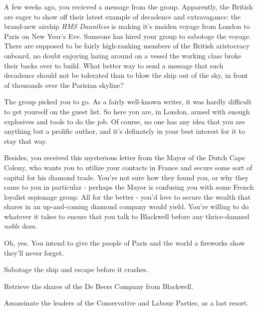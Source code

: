 \documentclass[char]{airship}
\begin{document}
A few weeks ago, you recieved a message from the group.  Apparently,
the British are eager to show off their latest example of decadence
and extravagance: the brand-new airship {\em HMS Dauntless} is making it's
maiden voyage from London to Paris on New Year's Eve.  Someone has
hired your group to sabotoge the voyage.  There are supposed to be
fairly high-ranking members of the British aristocracy onboard, no
doubt enjoying lazing around on a vessel the working class broke their
backs over to build.  What better way to send a message that such
decadence should not be tolerated than to blow the ship out of the
sky, in front of thousands over the Parisian skyline?

The group picked you to go.  As a fairly well-known writer, it was
hardly difficult to get yourself on the guest list.  So here you are,
in London, armed with enough explosives and tools to do the job.  Of
course, no one has any idea that you are anything but a prolific
author, and it's definately in your best interest for it to stay that
way. 

Besides, you received this mysterious letter from the Mayor of the 
Dutch Cape Colony, who wants you to utilize your contacts in France and
secure some sort of capital for his diamond trade. You're not sure how they found
you, or why they came to you in particular - perhaps the Mayor is confusing you with some French loyalist espionage group.
All for the better - you'd love to secure the wealth that shares in an up-and-coming
diamond company would yield. You're willing to do whatever it takes to ensure that
you talk to Blackwell before any thrice-damned \textit{noble} does.

Oh, yes. You intend to give the people of Paris and the world a fireworks
show they'll never forget.

\begin{itemz}[Goals]
  \item Sabotage the ship and escape before it crashes.
  \item Retrieve the shares of the De Beers Company from Blackwell.
  \item Assassinate the leaders of the Conservative and Labour Parties, as a last resort.
\end{itemz}
\end{document}
